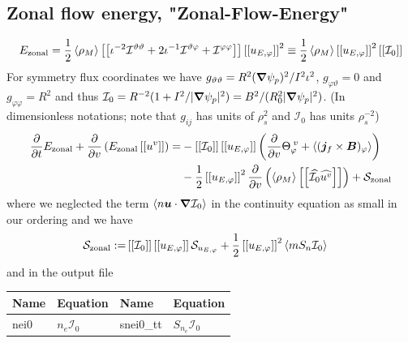 

\subsection{Zonal flow energy, "Zonal-Flow-Energy"}

\begin{align}
    E_\mathrm{zonal} = \frac{1}{2}\left \langle \rho_M \right \rangle\left[\left[  \iota^{-2}\mathcal I^{\vartheta\vartheta} + 2\iota^{-1}\mathcal I^{\vartheta\varphi} + \mathcal I^{\varphi\varphi} \right]\right] \left[\left[ u_{E,\varphi} \right]\right]^2
    \equiv \frac{1}{2} \left \langle \rho_M \right \rangle \left[\left[ u_{E,\varphi} \right]\right]^2  \left[\left[ \mathcal I_0 \right]\right]
    \label{eq:zonal_energy}
\end{align}
For symmetry flux coordinates we have $g_{\vartheta\vartheta} = R^2 ({\boldsymbol{\nabla}}\psi_p)^2/I^2\iota^2$, $g_{\varphi\vartheta} =0$ and $g_{\varphi\varphi}=R^2$ and thus $\mathcal I_0 = R^{-2}( 1 + I^2/|{\boldsymbol{\nabla}}\psi_p|^2)= B^2 / (R_0^2|{\boldsymbol{\nabla}}\psi_p|^2)$. (In dimensionless notations; note that $g_{ij}$ has units of $\rho_s^2$ and $\mathcal I_0$ has units $\rho_s^{-2}$)
\begin{align}\label{eq:perp_kinetic}
      \frac{\partial}{\partial t}E_{\mathrm{zonal}} +\frac{\partial}{\partial v } \left(E_{\mathrm{zonal}}\left[\left[ u^v \right]\right] \right)
  =&-\left[\left[ \mathcal I_0 \right]\right]\left[\left[ u_{E,\varphi} \right]\right]\left(\frac{\partial }{\partial v}  \Theta_{\varphi}^{\; v} + \left \langle ({\boldsymbol{j}}_f\times{\boldsymbol{B}})_\varphi \right \rangle\right)
  \nonumber\\
    &-\frac{1}{2}\left[\left[ u_{E,\varphi} \right]\right]^2\frac{\partial}{\partial v}\left(\left \langle \rho_M \right \rangle\left[\left[ \widehat{\mathcal I_0}\widehat{u^v} \right]\right]\right)
     + \mathcal S_{\mathrm{zonal}}
\end{align}
where we neglected the term $\left \langle n{\boldsymbol{u}}\cdot{\boldsymbol{\nabla}} \mathcal I_0 \right \rangle$ in the continuity equation as small in our ordering
 and we have
 \begin{align}
 \mathcal S_{\mathrm{zonal}} :=& \left[\left[ \mathcal I_0 \right]\right] \left[\left[ u_{E,\varphi} \right]\right] \mathcal S_{u_{E,\varphi}} + \frac{1}{2}\left[\left[ u_{E,\varphi} \right]\right]^2  \left \langle mS_n\mathcal I_0 \right \rangle
 \label{eq:zonal_source}
 \end{align}
 and in the output file
\begin{longtable}{llll}
\toprule
\rowcolor{gray!50}\textbf{Name} &  \textbf{Equation} &
\textbf{Name} &  \textbf{Equation}\\
\midrule
    nei0 &$n_e \mathcal I_0$ &
    snei0\_tt & $S_{n_e } \mathcal I_0$ \\
\bottomrule
\end{longtable}

